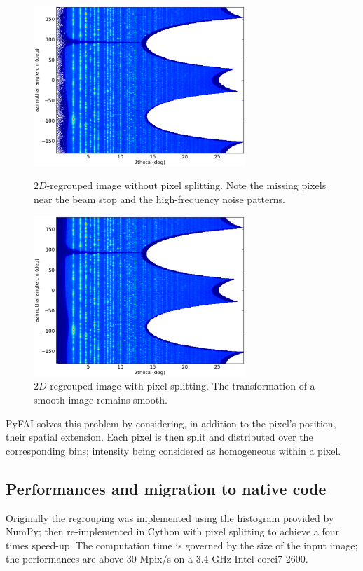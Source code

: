 \documentclass[a4paper]{jpconf}
\begin{document}
\begin{figure}[h]
\begin{minipage}{8cm}
\includegraphics[width=8cm]{img/2Dhistogram.eps}
\caption{\label{rough}$2D$-regrouped image without pixel splitting. Note
the missing pixels near the beam stop and the high-frequency noise patterns.}
\end{minipage}\hspace{5mm}
\begin{minipage}{8cm}
\includegraphics[width=8cm]{img/2DwithSplit.eps}
\caption{\label{smooth}$2D$-regrouped image with pixel splitting. The
transformation of a smooth image remains smooth.}
\end{minipage}
\end{figure}

PyFAI solves this problem by considering, in addition to the pixel's position,
their spatial extension. Each pixel is then split and distributed over the
corresponding bins; intensity being considered as homogeneous within a pixel.

\subsection{Performances and migration to native code}
Originally the regrouping was implemented
using the histogram provided by NumPy\cite{numpy}; then re-implemented in
Cython\cite{cython} with pixel splitting to achieve a four times speed-up.
The computation time is governed by the size of the input image; the performances
are above 30 Mpix/s on a 3.4 GHz Intel corei7-2600.
\end{document}
